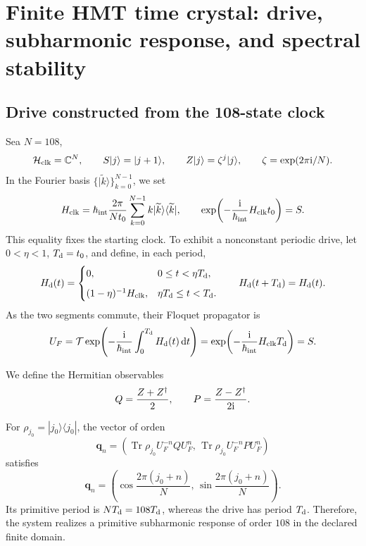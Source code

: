 \section{Finite HMT time crystal: drive, subharmonic response, and spectral stability}
\label{sec:hmtf2-cristal-temporal}

\subsection{Drive constructed from the 108-state clock}

Sea \(N=108\),
\[
 \mathcal H_{\rm clk}=\mathbb C^N,\qquad
 S|j\rangle=|j+1\rangle,\qquad
 Z|j\rangle=\zeta^j|j\rangle,\qquad
 \zeta=\exp(2\pi{\rm i}/N).
\]
In the Fourier basis \(\{|\widetilde k\rangle\}_{k=0}^{N-1}\), we set
\[
 H_{\rm clk}
 =\hbar_{\rm int}\frac{2\pi}{Nt_0}
 \sum_{k=0}^{N-1}k|\widetilde k\rangle\langle\widetilde k|,
 \qquad
 \exp\!\left(-\frac{{\rm i}}{\hbar_{\rm int}}H_{\rm clk}t_0\right)=S.
\]
This equality fixes the starting clock. To exhibit a nonconstant
periodic drive, let \(0<\eta<1\), \(T_{\rm d}=t_0\), and
define, in each period,
\[
 H_{\rm d}(t)=
 \begin{cases}
  0,&0\leq t<\eta T_{\rm d},\\[2mm]
  (1-\eta)^{-1}H_{\rm clk},
  &\eta T_{\rm d}\leq t<T_{\rm d}.
 \end{cases}
 \qquad H_{\rm d}(t+T_{\rm d})=H_{\rm d}(t).
\]
As the two segments commute, their Floquet propagator is
\[
 U_F
 =\mathcal T\exp\!\left(
 -\frac{{\rm i}}{\hbar_{\rm int}}\int_0^{T_{\rm d}}H_{\rm d}(t)\,\mathrm dt
 \right)
 =\exp\!\left(-\frac{{\rm i}}{\hbar_{\rm int}}H_{\rm clk}T_{\rm d}\right)
 =S.
\]

We define the Hermitian observables
\[
 Q=\frac{Z+Z^\dagger}{2},
 \qquad
 P=\frac{Z-Z^\dagger}{2{\rm i}}.
\]

\begin{theorem}
\label{thm:hmtf2-subarmonia-108}
For \(\rho_{j_0}=|j_0\rangle\langle j_0|\), the vector of orden
\[
 \mathbf q_n
 =\left(
 \operatorname{Tr}\rho_{j_0}U_F^{-n}QU_F^n,\,
 \operatorname{Tr}\rho_{j_0}U_F^{-n}PU_F^n
 \right)
\]
satisfies
\[
 \mathbf q_n
 =\left(
 \cos\frac{2\pi(j_0+n)}N,\,
 \sin\frac{2\pi(j_0+n)}N
 \right).
\]
Its primitive period is \(N T_{\rm d}=108T_{\rm d}\), whereas the drive
has period \(T_{\rm d}\). Therefore, the system realizes a primitive
subharmonic response of order \(108\) in the declared finite domain.
\end{theorem}

